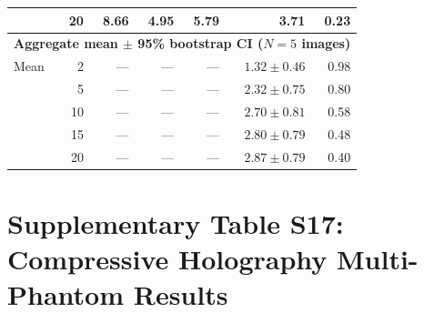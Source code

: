 \documentclass[11pt]{article}
\begin{document}
\begin{table}[htbp]
\begin{tabular}{l r r r r r r}
                & 20 &  8.66 &  4.95 &  5.79 & 3.71 & 0.23 \\
\midrule
\multicolumn{7}{l}{\textbf{Aggregate mean $\pm$ 95\% bootstrap CI ($N{=}5$ images)}} \\
\midrule
Mean   &  2 & --- & --- & --- & $1.32 \pm 0.46$ & 0.98 \\
       &  5 & --- & --- & --- & $2.32 \pm 0.75$ & 0.80 \\
       & 10 & --- & --- & --- & $2.70 \pm 0.81$ & 0.58 \\
       & 15 & --- & --- & --- & $2.80 \pm 0.79$ & 0.48 \\
       & 20 & --- & --- & --- & $2.87 \pm 0.79$ & 0.40 \\
\bottomrule
\end{tabular}
\end{table}

\section{Supplementary Table S17: Compressive Holography Multi-Phantom Results}
\label{sec:compholo_scenes}
\end{document}
